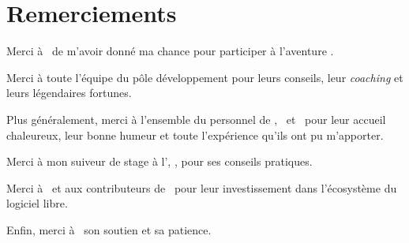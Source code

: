 \section*{Remerciements}

Merci à \ahugon\ de m'avoir donné ma chance pour participer à l'aventure \asl.

Merci à toute l'équipe du pôle développement pour leurs conseils, leur \textit{coaching} et leurs légendaires fortunes.

Plus généralement, merci à l'ensemble du personnel de \asl, \aes\ et \asm\ pour leur accueil chaleureux, leur bonne humeur et toute l'expérience qu'ils ont pu m'apporter.

Merci à mon suiveur de stage à l'\autc, \asuiveur, pour ses conseils pratiques.

Merci à \apotencier\ et aux contributeurs de \asf\ pour leur investissement dans l'écosystème du logiciel libre.

Enfin, merci à \asarah\ son soutien et sa patience.
